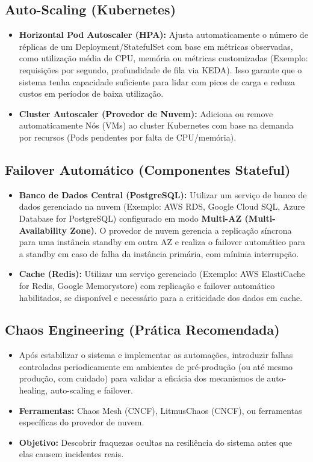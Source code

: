 \subsection{Auto-Scaling (Kubernetes)}
\label{subsec:auto-scaling}
\begin{itemize}
    \item \textbf{Horizontal Pod Autoscaler (HPA):} Ajusta automaticamente o número de réplicas de um Deployment/StatefulSet com base em métricas observadas, como utilização média de CPU, memória ou métricas customizadas (Exemplo: requisições por segundo, profundidade de fila via KEDA). Isso garante que o sistema tenha capacidade suficiente para lidar com picos de carga e reduza custos em períodos de baixa utilização.
    \item \textbf{Cluster Autoscaler (Provedor de Nuvem):} Adiciona ou remove automaticamente Nós (VMs) ao cluster Kubernetes com base na demanda por recursos (Pods pendentes por falta de CPU/memória).
\end{itemize}

\subsection{Failover Automático (Componentes Stateful)}
\label{subsec:failover-automatico}
\begin{itemize}
    \item \textbf{Banco de Dados Central (PostgreSQL):} Utilizar um serviço de banco de dados gerenciado na nuvem (Exemplo: AWS RDS, Google Cloud SQL, Azure Database for PostgreSQL) configurado em modo \textbf{Multi-AZ (Multi-Availability Zone)}. O provedor de nuvem gerencia a replicação síncrona para uma instância standby em outra AZ e realiza o failover automático para a standby em caso de falha da instância primária, com mínima interrupção.
    \item \textbf{Cache (Redis):} Utilizar um serviço gerenciado (Exemplo: AWS ElastiCache for Redis, Google Memorystore) com replicação e failover automático habilitados, se disponível e necessário para a criticidade dos dados em cache.
\end{itemize}

\subsection{Chaos Engineering (Prática Recomendada)}
\label{subsec:chaos-engineering}
\begin{itemize}
    \item Após estabilizar o sistema e implementar as automações, introduzir falhas controladas periodicamente em ambientes de pré-produção (ou até mesmo produção, com cuidado) para validar a eficácia dos mecanismos de auto-healing, auto-scaling e failover.
    \item \textbf{Ferramentas:} Chaos Mesh (CNCF), LitmusChaos (CNCF), ou ferramentas específicas do provedor de nuvem.
    \item \textbf{Objetivo:} Descobrir fraquezas ocultas na resiliência do sistema antes que elas causem incidentes reais.
\end{itemize}

